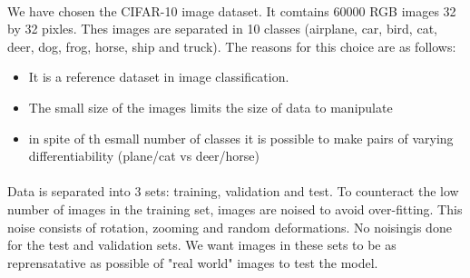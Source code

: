 \documentclass[11 pt]{article}
\begin{document}
\paragraph{}We have chosen the CIFAR-10 image dataset. It comtains 60000 RGB images 32 by 32 pixles. Thes images are separated in 10 classes (airplane, car, bird, cat, deer, dog, frog, horse, ship and truck). The reasons for this choice are as follows:\\ \medskip

\begin{itemize}
  \item It is a reference dataset in image classification.
  \item The small size of the images limits the size of data to manipulate
  \item in spite of th esmall number of classes it is possible to make pairs of varying differentiability (plane/cat vs deer/horse)
\end{itemize}

\paragraph{}Data is separated into 3 sets: training, validation and test. To counteract the low number of images in the training set, images are noised to avoid over-fitting. This noise consists of rotation, zooming and random deformations. No noisingis done for the test and validation sets. We want images in these sets to be as reprensatative as possible of "real world" images to test the model.
\end{document}
